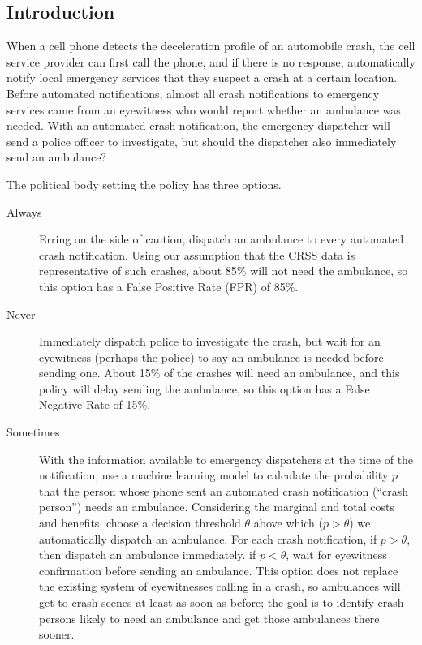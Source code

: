 
\subsection{Introduction}

When a cell phone detects the deceleration profile of an automobile crash, the cell service provider can first call the phone, and if there is no response, automatically notify local emergency services that they suspect a crash at a certain location.  Before automated notifications, almost all crash notifications to emergency services came from an eyewitness who would report whether an ambulance was needed.  With an automated crash notification, the emergency dispatcher will send a police officer to investigate, but should the dispatcher also immediately send an ambulance?  

The political body setting the policy has three options.  

\begin{description}
	\item [Always] Erring on the side of caution, dispatch an ambulance  to every automated crash notification.  Using our assumption that the CRSS data is representative of such crashes, about 85\% will not need the ambulance, so this option has a False Positive Rate (FPR) of 85\%.
	\item [Never] Immediately dispatch police to investigate the crash, but wait for an eyewitness (perhaps the police) to say an ambulance is needed before sending one.  About 15\% of the crashes will need an ambulance, and this policy will delay sending the ambulance, so this option has a False Negative Rate of 15\%.
	\item [Sometimes]  With the information available to emergency dispatchers at the time of the notification, use a machine learning model to calculate the probability $p$ that the person whose phone sent an automated crash notification (``crash person'') needs an ambulance.  Considering the marginal and total costs and benefits, choose a decision threshold $\theta$ above which ($p > \theta$) we automatically dispatch an ambulance.  For each crash notification, if $p > \theta$, then dispatch an ambulance immediately. if $p<\theta$, wait for eyewitness confirmation before sending an ambulance.  This option does not replace the existing system of eyewitnesses calling in a crash, so ambulances will get to crash scenes at least as soon as before; the goal is to identify crash persons likely to need an ambulance and get those ambulances there sooner.
\end{description}

